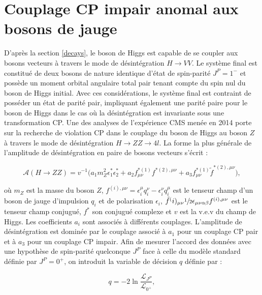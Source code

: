 \section{Couplage CP impair anomal aux bosons de jauge}
\label{anomalous}

D'après la section \ref{decays}, le boson de Higgs est capable de se coupler aux bosons vecteurs à travers le mode de désintégration $H\rightarrow VV$. Le système final est constitué de deux bosons de nature identique d'état de spin-parité $J^P=1^-$ et possède un moment orbital angulaire total pair tenant compte du spin nul du boson de Higgs initial. Avec ces considérations, le système final est contraint de posséder un état de parité pair, impliquant également une parité paire pour le boson de Higgs dans le cas où la désintégration est invariante sous une transformation CP. Une des analyses de l'expérience CMS menée en 2014 \cite{Z4lCP} porte sur la recherche de violation CP dans le couplage du boson de Higgs au boson $Z$ à travers le mode de désintégration $H\rightarrow ZZ\rightarrow 4l$. La forme la plus générale de l'amplitude de désintégration en paire de bosons vecteurs s'écrit :

\begin{equation}
    \mathcal{A}(H\rightarrow ZZ)=v^{-1}\bigl(a_1m^2_Z\epsilon^*_1\epsilon^*_2+a_2f^{*(1)}_{\mu\nu}f^{*(2),\mu\nu}+a_3f^{*(1)}_{\mu\nu}\tilde{f}^{*(2),\mu\nu}\bigr),
    \label{HZZdecay}
\end{equation}

où $m_Z$ est la masse du boson $Z$, $f^{(i),\mu\nu}=\epsilon_i^{\mu}q_i^{\nu}-\epsilon_i^{\nu}q_i^{\mu}$ est le tenseur champ d'un boson de jauge d'impulsion $q_i$ et de polarisation $\epsilon_i$, $\tilde{f}^(i)_{\mu\nu}\sfrac{1}{2}\epsilon_{\mu\nu\alpha\beta}f^{(i),\mu\nu}$ est le tenseur champ conjugué, $f^*$ son conjugué complexe et $v$ est la v.e.v du champ de Higgs. Les coefficients $a_i$ sont associés à différents couplages. L'amplitude de désintégration est dominée par le couplage associé à $a_1$ pour un couplage CP pair et à $a_3$ pour un couplage CP impair. Afin de mesurer l'accord des données avec une hypothèse de spin-parité quelconque $J^P$ face à celle du modèle standard définie par $J^P=0^+$, on introduit la variable de décision $q$ définie par :

\begin{equation}
    q=-2\ln \frac{\mathcal{L}_{J^P}}{\mathcal{L}_{0^+}},
\end{equation}

